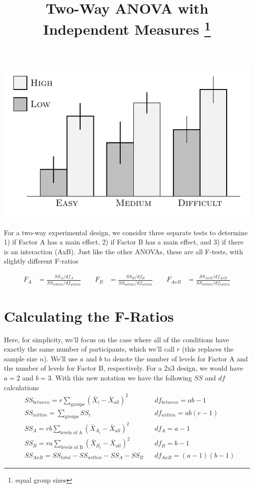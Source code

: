 \documentclass{tufte-handout}
\title{Two-Way ANOVA with Independent Measures \thanks{equal group sizes}}
\date{} %
\begin{document}
\maketitle%



\begin{marginfigure}[190pt]
  \includegraphics[width=\linewidth]{images/anova_data_two-way}%
  \label{fig:fullfig}%
\end{marginfigure}

For a two-way experimental design, we consider three separate tests to determine 1) if Factor A has a main effect, 2) if Factor B has a main effect, and 3) if there is an interaction (AxB). Just like the other ANOVAs, these are all F-tests, with slightly different F-ratios

\begin{align*}
F_A&=\frac{SS_A/df_A}{SS_{within}/df_{within}} \qquad
F_B&=\frac{SS_B/df_B}{SS_{within}/df_{within}} \qquad
F_{AxB} &= \frac{SS_{AxB}/df_{AxB}}{SS_{within}/df_{within}}
\end{align*}

\section{Calculating the F-Ratios}
Here, for simplicity, we'll focus on the case where all of the conditions have exactly the same number of participants, which we'll call $r$  (this replaces the sample size $n$). We'll use $a$  and $b$ to denote the number of levels for Factor A and the number of levels for Factor B, respectively. For a 2x3 design, we would have  $a=2$ and $b=3$. With this new notation we have the following $SS$ and $df$ calculations
\begin{align*}
&SS_{between} = r \sum_{\text{groups}} \left( \bar{X}_i - \bar{X}_{all} \right)^2 & &df_{between} = ab-1\\
&SS_{within} = \sum_{\text{groups}} SS_i & &df_{within} = ab(r-1)\\
&SS_A = rb\sum_{\text{levels of A}} \left( \bar{X}_{A_i} - \bar{X}_{all} \right)^2 & &df_A = a-1\\
&SS_B = ra\sum_{\text{levels of B}} \left( \bar{X}_{B_i} - \bar{X}_{all} \right)^2 & &df_B = b-1\\
&SS_{AxB}=SS_{total}-SS_{within}-SS_A-SS_B & &df_{AxB} = (a-1)(b-1)
\end{align*}
\end{document}
